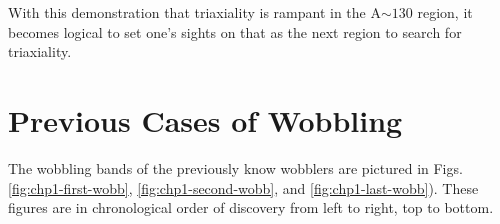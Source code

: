 With this demonstration that triaxiality is rampant in the A$\sim{}130$ region, it becomes logical to set one's sights on that as the next region to search for triaxiality. 

\section{Previous Cases of Wobbling}
\label{sec:trw-prev}
The wobbling bands of the previously know wobblers are pictured in Figs. \ref{fig:chp1-first-wobb}, \ref{fig:chp1-second-wobb}, and \ref{fig:chp1-last-wobb}). These figures are in chronological order of discovery from left to right, top to bottom.%

